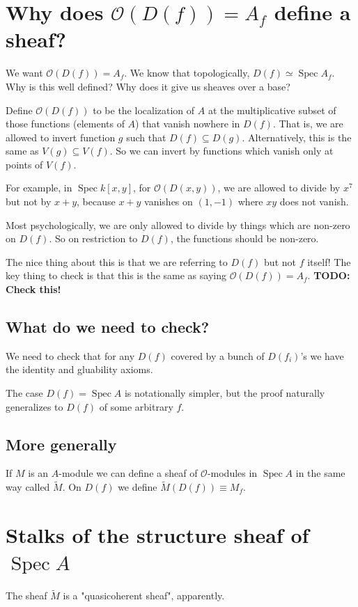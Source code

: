 \documentclass{book}
\renewcommand{\O}{\ensuremath{\mathcal{O}}}
\newcommand{\Spec}{\operatorname{Spec}}
\newcommand{\spec}{\operatorname{Spec}}
\theoremstyle{definition}
\begin{document}
\section{Why does $\O(D(f)) = A_f$ define a sheaf?}
We want $\O(D(f)) = A_f$. We know that topologically, $D(f) \simeq \Spec A_f$.
Why is this well defined? Why does it give us sheaves over a base?


Define $\O(D(f))$ to be the localization of $A$ at the multiplicative subset
of those functions (elements of $A$) that vanish nowhere in $D(f)$. That is,
we are allowed to invert function $g$ such that $D(f) \subseteq D(g)$. 
Alternatively, this is the same as $V(g) \subseteq V(f)$. So we can invert
by functions which vanish only at points of $V(f)$.

For example, in $\spec k[x, y]$, for $\O(D(x, y))$, we are allowed to divide
by $x^7$ but not by $x + y$, because $x + y$ vanishes on $(1, -1)$ where $xy$
does not vanish. 

Most psychologically, we are only allowed to divide by things which 
are non-zero on $D(f)$. So on restriction to $D(f)$, the functions should
be non-zero.

The nice thing about this is that we are referring to $D(f)$ but not $f$
itself! The key thing to check is that this is the same as saying
$\O(D(f)) = A_f$. \textbf{TODO: Check this!}


\subsection{What do we need to check?}
We need to check that for any $D(f)$ covered by a bunch of $D(f_i)$'s 
we have the identity and gluability axioms.

The case $D(f) = \spec A$ is notationally simpler, but the proof
naturally generalizes to $D(f)$ of some arbitrary $f$.

\subsection{More generally}
If $M$ is an $A$-module we can define a sheaf of $\O$-modules in $\spec A$
in the same way called $\tilde{M}$. On $D(f)$ we define $\tilde{M}(D(f)) \equiv M_f$.

\section{Stalks of the structure sheaf of $\Spec A$}
The sheaf $\tilde{M}$ is a "quasicoherent sheaf", apparently.
\end{document}
